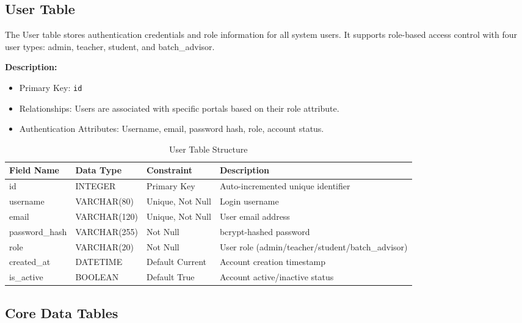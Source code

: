 \subsection{User Table}

The User table stores authentication credentials and role information for all system users. It supports role-based access control with four user types: admin, teacher, student, and batch\_advisor.

\textbf{Description:}
\begin{itemize}
    \item Primary Key: \texttt{id}
    \item Relationships: Users are associated with specific portals based on their role attribute.
    \item Authentication Attributes: Username, email, password hash, role, account status.
\end{itemize}

\begin{table}[H]
\centering
\caption{User Table Structure}

\begin{tabularx}{\textwidth}{|p{3cm}|p{3cm}|p{3cm}|X|}
\hline
\textbf{Field Name} & \textbf{Data Type} & \textbf{Constraint} & \textbf{Description} \\
\hline
id & INTEGER & Primary Key & Auto-incremented unique identifier \\
\hline
username & VARCHAR(80) & Unique, Not Null & Login username \\
\hline
email & VARCHAR(120) & Unique, Not Null & User email address \\
\hline
password\_hash & VARCHAR(255) & Not Null & bcrypt-hashed password \\
\hline
role & VARCHAR(20) & Not Null & User role (admin/teacher/student/batch\_advisor) \\
\hline
created\_at & DATETIME & Default Current & Account creation timestamp \\
\hline
is\_active & BOOLEAN & Default True & Account active/inactive status \\
\hline
\end{tabularx}

\end{table}



\subsection{Core Data Tables}

